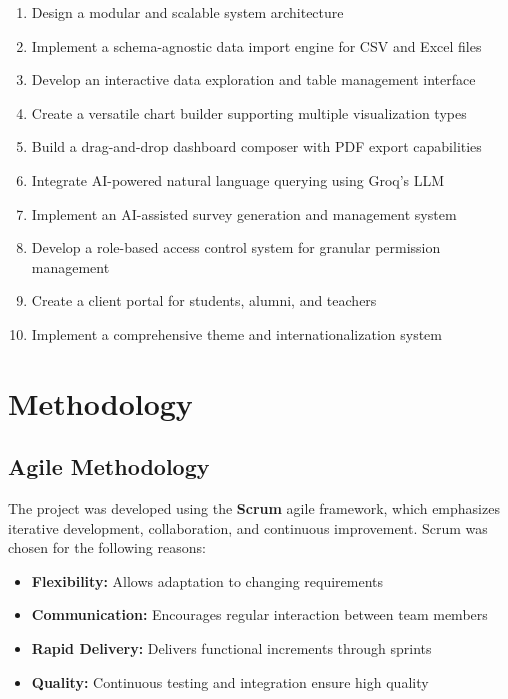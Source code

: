 \documentclass[12pt,a4paper]{report}
\begin{document}
\begin{enumerate}
    \item Design a modular and scalable system architecture
    \item Implement a schema-agnostic data import engine for CSV and Excel files
    \item Develop an interactive data exploration and table management interface
    \item Create a versatile chart builder supporting multiple visualization types
    \item Build a drag-and-drop dashboard composer with PDF export capabilities
    \item Integrate AI-powered natural language querying using Groq's LLM
    \item Implement an AI-assisted survey generation and management system
    \item Develop a role-based access control system for granular permission management
    \item Create a client portal for students, alumni, and teachers
    \item Implement a comprehensive theme and internationalization system
\end{enumerate}

\section{Methodology}

\subsection{Agile Methodology}

The project was developed using the \textbf{Scrum} agile framework, which emphasizes iterative development, collaboration, and continuous improvement. Scrum was chosen for the following reasons:
\begin{itemize}
    \item \textbf{Flexibility:} Allows adaptation to changing requirements
    \item \textbf{Communication:} Encourages regular interaction between team members
    \item \textbf{Rapid Delivery:} Delivers functional increments through sprints
    \item \textbf{Quality:} Continuous testing and integration ensure high quality
\end{itemize}
\end{document}
